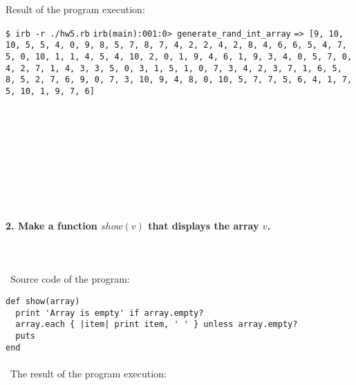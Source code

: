 \documentclass{article}
\begin{document}
\paragraph{}\

	Result of the program execution:
\rmfamily\newline

\noindent \texttt{\$ irb -r ./hw5.rb}\newline
\noindent \texttt{irb(main):001:0> generate_rand_int_array}\newline
\noindent \texttt{=> [9, 10, 10, 5, 5, 4, 0, 9, 8, 5, 7, 8, 7, 4, 2, 2, 4, 2, 8, 4, 6, 6, 5, 4, 7, 5, 0, 10, 1, 1, 4, 5, 4, 10, 2, 0, 1, 9, 4, 6, 1, 9, 3, 4, 0, 5, 7, 0, 4, 2, 7, 1, 4, 3, 3, 5, 0, 3, 1, 5, 1, 0, 7, 3, 4, 2, 3, 7, 1, 6, 5, 8, 5, 2, 7, 6, 9, 0, 7, 3, 10, 9, 4, 8, 0, 10, 5, 7, 7, 5, 6, 4, 1, 7, 5, 10, 1, 9, 7, 6]}

\paragraph{}\
\paragraph{}\
\paragraph{}\
\paragraph{}\

	\paragraph{2. Make a function \(show(v)\) that displays the array \(v\). }\

\paragraph{}\	
Source code of the program:

\begin{verbatim} 
def show(array)
  print 'Array is empty' if array.empty?
  array.each { |item| print item, ' ' } unless array.empty?
  puts
end
\end{verbatim}	

\paragraph{}\
	The result of the program execution:
	
\end{document}
